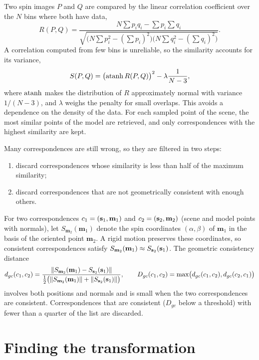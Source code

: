 Two spin images $P$ and $Q$ are compared by the linear correlation coefficient over the $N$ bins
where both have data,
\begin{equation}
R(P,Q)=\frac{N\sum p_iq_i-\sum p_i\sum q_i}{\sqrt{\bigl(N\sum p_i^2-(\sum p_i)^2\bigr)\bigl(N\sum q_i^2-(\sum q_i)^2\bigr)}} .
\end{equation}
A correlation computed from few bins is unreliable, so the similarity accounts for its variance,
\begin{equation}
S(P,Q)=\bigl(\operatorname{atanh} R(P,Q)\bigr)^2-\lambda\frac{1}{N-3},
\end{equation}
where $\operatorname{atanh}$ makes the distribution of $R$ approximately normal with variance $1/(N-3)$, and
$\lambda$ weighs the penalty for small overlaps. This avoids a dependence on the density of the
data. For each sampled point of the scene, the most similar points of the model are retrieved, and
only correspondences with the highest similarity are kept.

Many correspondences are still wrong, so they are filtered in two steps:
\begin{enumerate}
  \item discard correspondences whose similarity is less than half of the maximum similarity;
  \item discard correspondences that are not geometrically consistent with enough others.
\end{enumerate}
For two correspondences $c_1=(\mathbf{s}_1,\mathbf{m}_1)$ and $c_2=(\mathbf{s}_2,\mathbf{m}_2)$ (scene and model points with
normals), let $S_{\mathbf{m}_2}(\mathbf{m}_1)$ denote the spin coordinates $(\alpha,\beta)$ of $\mathbf{m}_1$ in the
basis of the oriented point $\mathbf{m}_2$. A rigid motion preserves these coordinates, so consistent
correspondences satisfy $S_{\mathbf{m}_2}(\mathbf{m}_1)\approx S_{\mathbf{s}_2}(\mathbf{s}_1)$. The geometric consistency
distance
\begin{equation}
d_{gc}(c_1,c_2)=\frac{\left\lVert S_{\mathbf{m}_2}(\mathbf{m}_1)-S_{\mathbf{s}_2}(\mathbf{s}_1)\right\rVert}{\tfrac12\bigl(\left\lVert S_{\mathbf{m}_2}(\mathbf{m}_1)\right\rVert+\left\lVert S_{\mathbf{s}_2}(\mathbf{s}_1)\right\rVert\bigr)},\qquad
D_{gc}(c_1,c_2)=\max\bigl(d_{gc}(c_1,c_2),d_{gc}(c_2,c_1)\bigr)
\end{equation}
involves both positions and normals and is small when the two correspondences are consistent.
Correspondences that are consistent ($D_{gc}$ below a threshold) with fewer than a quarter of the
list are discarded.

\section{Finding the transformation}

